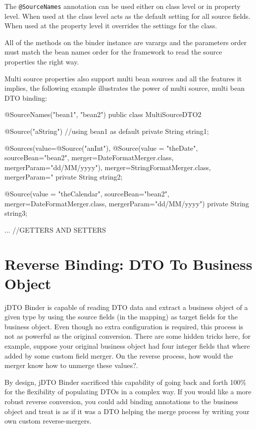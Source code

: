 \documentclass[11pt]{article}
\newcommand{\JDTO}{jDTO Binder\xspace}
\begin{document}
The \texttt{@SourceNames} annotation can be used either on class level or in property level. When used at the class level acts as the default setting for all source fields. When used at the property level it overrides the settings for the class.

All of the methods on the binder instance are varargs and the parameters order must match the bean names order for the framework to read the source properties the right way.

Multi source properties also support multi bean sources and all the features it implies, the following example illustrates the power of multi source, multi bean DTO binding:


\begin{java}
@SourceNames({"bean1", "bean2"})
public class MultiSourceDTO2 {
    @Source("aString") //using bean1 as default
    private String string1;
    
    @Sources(value={@Source("anInt"), 
            @Source(value = "theDate", 
            sourceBean="bean2", 
            merger=DateFormatMerger.class, 
            mergerParam="dd/MM/yyyy")}, 
        merger=StringFormatMerger.class, mergerParam="%
    private String string2;
    
    @Source(value = "theCalendar", sourceBean="bean2", 
        merger=DateFormatMerger.class, mergerParam="dd/MM/yyyy")
    private String string3;

    ... //GETTERS AND SETTERS
}
\end{java}


\section{Reverse Binding: DTO To Business Object}

\JDTO is capable of reading DTO data and extract a business object of a given type by using the source fields (in the mapping) as target fields for the business object. Even though no extra configuration is required, this process is not as powerful as the original conversion. There are some hidden tricks here, for example, suppose your original business object had four integer fields that where added by some custom field merger. On the reverse process, how would the merger know how to unmerge these values?. 

By design, \JDTO sacrificed this capability of going back and forth 100\% for the flexibility of populating DTOs in a complex way. If you would like a more robust reverse conversion, you could add binding annotations to the business object and treat is as if it was a DTO helping the merge process by writing your own custom reverse-mergers.
\end{document}
